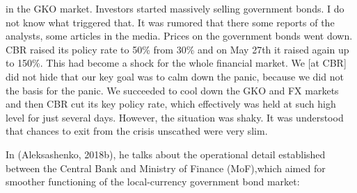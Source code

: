 in the GKO market. Investors started massively selling government bonds. I do not know what triggered that. It was rumored that there some reports of the analysts, some articles in the media. Prices on the government bonds went down. CBR raised its policy rate to 50\% from 30\% and on May 27th it raised again up to 150\%. This had become a shock for the whole financial market. We [at CBR] did not hide that our key goal was to calm down the panic, because we did not the basis for the panic. We succeeded to cool down the GKO and FX markets and then CBR cut its key policy rate, which effectively was held at such high level for just several days. However, the situation was shaky. It was understood that chances to exit from the crisis unscathed were very slim.

In (Aleksashenko, 2018b),  he talks about the operational detail established between the Central Bank and Ministry of Finance (MoF),which aimed for smoother functioning of the local-currency government bond market:

